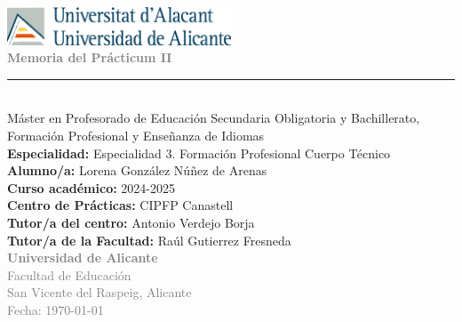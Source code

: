 \begin{titlepage}
    \begin{center}
        \vspace*{2cm}
        
        \includegraphics[width=0.5\textwidth]{resources/logo_ua.png}\\[1cm]
        
        \textcolor{gray}{\Huge \textbf{Memoria del Prácticum II}}\\[1cm]
        \rule{10cm}{0.4mm} \\[1cm]
        
        {\Large Máster en Profesorado de Educación Secundaria Obligatoria y Bachillerato, Formación Profesional y Enseñanza de Idiomas}\\[1cm]
        
        \textbf{Especialidad:} Especialidad 3. Formación Profesional Cuerpo Técnico\\[0.5cm]
        \textbf{Alumno/a:} Lorena González Núñez de Arenas\\[0.5cm]
        \textbf{Curso académico:} 2024-2025\\[0.5cm]
        \textbf{Centro de Prácticas:} CIPFP Canastell\\[0.5cm]
        \textbf{Tutor/a del centro:} Antonio Verdejo Borja\\[0.5cm]
        \textbf{Tutor/a de la Facultad:} Raúl Gutierrez Fresneda\\[0.5cm]
        
        \vfill
        \textcolor{gray}{\Large \textbf{Universidad de Alicante}}\\
        \textcolor{gray}{Facultad de Educación}\\
        \textcolor{gray}{San Vicente del Raspeig, Alicante}\\
        \textcolor{gray}{Fecha: \today}
    \end{center}
\end{titlepage}